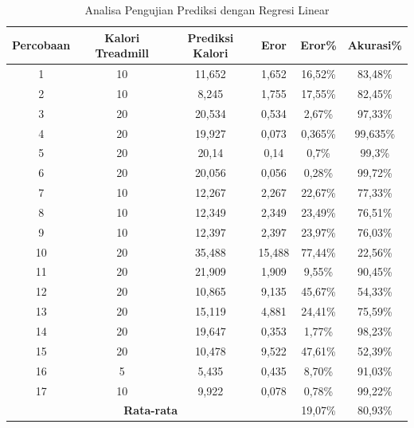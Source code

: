\begin{longtable}{|c|c|c|c|c|c|}
  \caption{Analisa Pengujian Prediksi dengan Regresi Linear}
  \label{tb:AnalisaPrediksiRegresi}                                   \\
  \hline
  \rowcolor[HTML]{C0C0C0}
  \textbf{Percobaan} & \textbf{Kalori Treadmill} & \textbf{Prediksi Kalori} & \textbf{Eror} & \textbf{Eror\%} & \textbf{Akurasi\%} \\
  \hline
  1   & 10   & 11,652   & 1,652    & 16,52\%     & 83,48\%   \\
  \hline
  2   & 10   & 8,245    & 1,755    & 17,55\%     & 82,45\%   \\
  \hline
  3   & 20   & 20,534   & 0,534    & 2,67\%      & 97,33\%   \\
  \hline
  4   & 20   & 19,927   & 0,073    & 0,365\%     & 99,635\%  \\
  \hline
  5   & 20   & 20,14    & 0,14     & 0,7\%       & 99,3\%    \\
  \hline
  6   & 20   & 20,056   & 0,056    & 0,28\%      & 99,72\%   \\
  \hline
  7   & 10   & 12,267   & 2,267    & 22,67\%     & 77,33\%   \\
  \hline
  8   & 10   & 12,349   & 2,349    & 23,49\%     & 76,51\%   \\
  \hline
  9   & 10   & 12,397   & 2,397    & 23,97\%     & 76,03\%   \\
  \hline
  10   & 20   & 35,488   & 15,488   & 77,44\%     & 22,56\%   \\
  \hline
  11   & 20   & 21,909   & 1,909    & 9,55\%      & 90,45\%   \\
  \hline
  12   & 20   & 10,865   & 9,135    & 45,67\%     & 54,33\%   \\
  \hline
  13   & 20   & 15,119   & 4,881    & 24,41\%     & 75,59\%   \\
  \hline
  14   & 20   & 19,647   & 0,353    & 1,77\%      & 98,23\%   \\
  \hline
  15   & 20   & 10,478   & 9,522    & 47,61\%     & 52,39\%   \\
  \hline
  16   & 5   & 5,435    & 0,435     & 8,70\%      & 91,03\%   \\
  \hline
  17   & 10   & 9,922    & 0,078    & 0,78\%      & 99,22\%   \\
  \hline

  \multicolumn{4}{|c|}{\textbf{Rata-rata}} & 19,07\% & 80,93\% \\
  \hline
\end{longtable}

